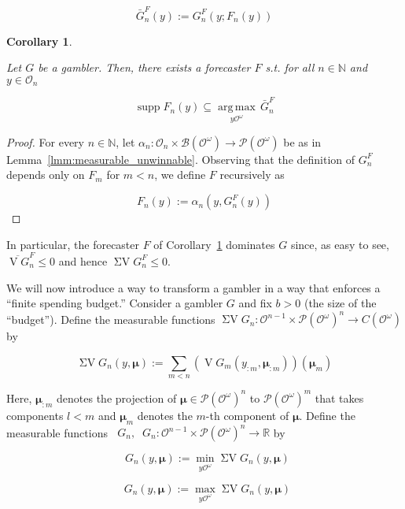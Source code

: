 \documentclass[11pt]{article}
\theoremstyle{definition}
\theoremstyle{plain}
\newtheorem{corollary}{Corollary}%
\newcommand{\Nats}{\mathbb{N}}
\newcommand{\Reals}{\mathbb{R}}
\newcommand{\Argmax}[1]{\underset{#1}{\operatorname{arg\,max}}\,}
\newcommand{\PM}{\mathcal{P}}
\DeclareMathOperator{\Sp}{supp}
\newcommand{\Ob}{\mathcal{O}}
\newcommand{\OO}{\Ob^\omega}
\newcommand{\PMO}{\PM(\OO)}
\newcommand{\Gm}{\mathcal{B}}
\newcommand{\GMO}{\Gm(\OO)}
\newcommand{\CO}{C(\OO)}
\DeclareMathOperator{\V}{V}
\DeclareMathOperator{\SV}{\Sigma V}
\DeclareMathOperator{\SVM}{\Sigma V_{\min}}
\DeclareMathOperator{\SVX}{\Sigma V_{\max}}
\newcommand{\BM}{\bm{\mu}}
\begin{document}
\begin{equation}
\bar{G}^F_n(y) := G^F_n(y;F_n(y))
\end{equation}

\begin{corollary}
\label{crl:dominate_one}

Let $G$ be a gambler. Then, there exists a forecaster $F$ s.t. for all $n \in \Nats$ and $y \in \Ob_n$

\begin{equation}
\Sp F_n(y) \subseteq \Argmax{y\OO} \bar{G}^F_n
\end{equation}

\end{corollary}

\begin{proof}

For every $n \in \Nats$, let $\alpha_n: \Ob_n \times \GMO \rightarrow \PMO$ be as in Lemma~\ref{lmm:measurable_unwinnable}. Observing that the definition of $G^F_n$ depends only on $F_m$ for $m < n$, we define $F$ recursively as

\[F_n(y):=\alpha_n(y,G^F_n(y))\]
\end{proof}

In particular, the forecaster $F$ of Corollary~\ref{crl:dominate_one} dominates $G$ since, as easy to see, $\overline{\V G}^F_n \leq 0$ and hence $\SV G^F_n \leq 0$.

We will now introduce a way to transform a gambler in a way that enforces a \enquote{finite spending budget.} Consider a gambler $G$ and fix $b > 0$ (the size of the \enquote{budget}). Define the measurable functions $\SV G_n: \Ob^{n-1} \times \PMO^n  \rightarrow \CO$ by

\begin{equation}
\SV G_n(y,\BM) := \sum_{m < n} (\V G_m(y_{:m},\BM_{:m}))(\BM_m)
\end{equation}

Here, $\BM_{:m}$ denotes the projection of $\BM \in \PMO^n$ to $\PMO^m$ that takes components $l < m$ and $\BM_m$ denotes the $m$-th component of $\BM$. Define the measurable functions $\SVM G_n, \SVX G_n: \Ob^{n-1} \times \PMO^n  \rightarrow \Reals$ by

\begin{equation}
\SVM G_n(y,\BM) := \min_{y\OO}{\SV G_n(y,\BM)}
\end{equation}

\begin{equation}
\SVX G_n(y,\BM) := \max_{y\OO}{\SV G_n(y,\BM)}
\end{equation}
\end{document}
